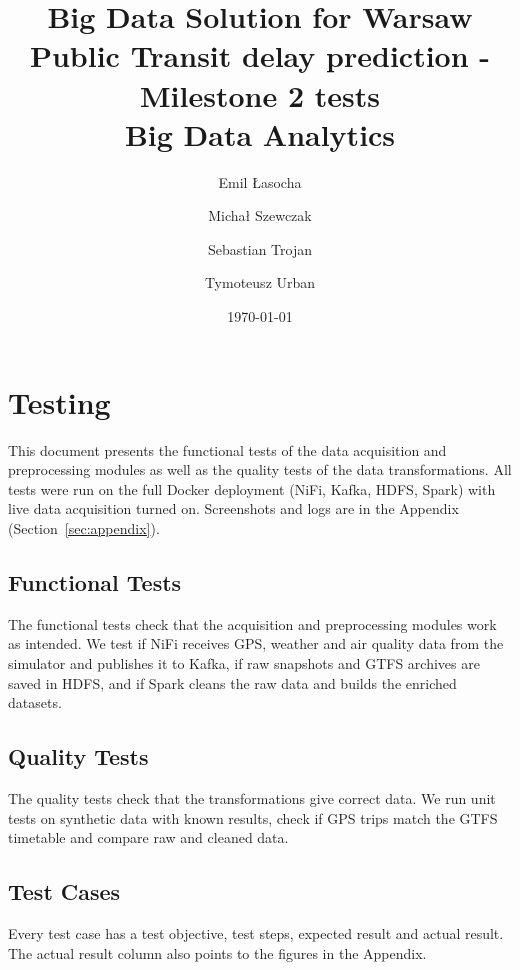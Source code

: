 \documentclass[11pt]{article}
\title{
    \textbf{Big Data Solution for Warsaw Public Transit delay prediction - Milestone 2 tests} \\[0.5cm]
    \large Big Data Analytics
}
\author{Emil Łasocha \and Michał Szewczak \and Sebastian Trojan \and Tymoteusz Urban}
\date{\today}
\begin{document}
\maketitle

\section{Testing}

This document presents the functional tests of the data acquisition and preprocessing modules
as well as the quality tests of the data transformations. All tests were run on the full Docker
deployment (NiFi, Kafka, HDFS, Spark) with live data acquisition turned on. Screenshots and logs
are in the Appendix (Section~\ref{sec:appendix}).

\subsection{Functional Tests}

The functional tests check that the acquisition and preprocessing modules work as intended. We test
if NiFi receives GPS, weather and air quality data from the simulator and publishes it to Kafka,
if raw snapshots and GTFS archives are saved in HDFS, and if Spark cleans the raw data and builds
the enriched datasets.

\subsection{Quality Tests}

The quality tests check that the transformations give correct data. We run unit tests on synthetic
data with known results, check if GPS trips match the GTFS timetable and compare raw and cleaned
data.

\subsection{Test Cases}

Every test case has a test objective, test steps, expected result and actual result. The actual
result column also points to the figures in the Appendix.
\end{document}
